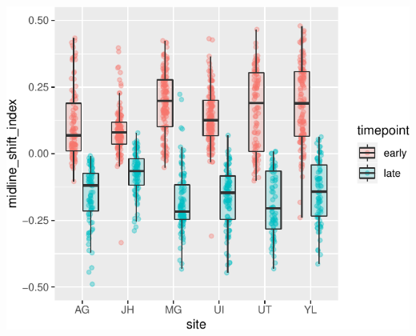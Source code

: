 \documentclass[
]{article}
\begin{document}
\begin{center}\includegraphics{paper_files/figure-latex/plot_shift_both-1} \end{center}
\end{document}
